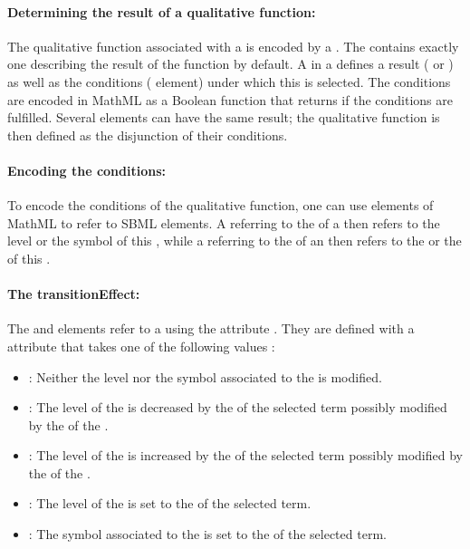 \paragraph{Determining the result of a qualitative function:}
The qualitative function associated with a  is encoded by a . The  contains exactly one  describing the result of the function by default. A  in a  defines a result ( or ) as well as the conditions ( element) under which this  is selected.
The conditions are encoded in MathML as a Boolean function that returns  if the conditions are fulfilled.
Several  elements can have the same result; the qualitative function is then defined as the disjunction of their conditions. 

\paragraph{Encoding the conditions:}
To encode the conditions of the qualitative function, one can use  elements of MathML to refer to SBML elements. A  referring to the  of a  then refers to the level or the symbol of this , while a  referring to the  of an  then refers to the  or the  of this .


\paragraph{The transitionEffect:}
The  and  elements refer to a  using the attribute . They are defined with a  attribute that takes one of the following values :
\begin{itemize}
	\item {}: Neither the level nor the symbol associated to the  is modified.
	\item {}: The level of the  is decreased by the  of the selected term possibly modified by the  of the .
	\item {}: The level of the  is increased by the  of the selected term possibly modified by the  of the .
	\item {}: The level of the  is set to the  of the selected term.
	\item {}: The symbol associated to the  is set to the  of the selected term.
\end{itemize}


